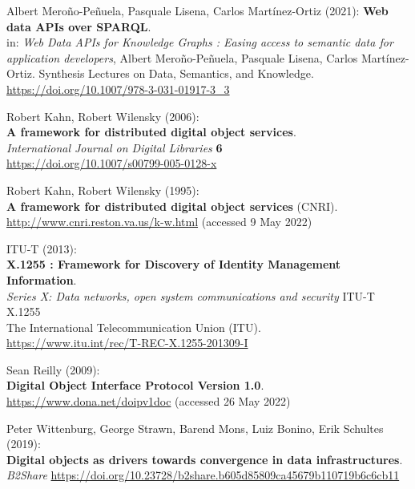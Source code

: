 \begin{thebibliography}{9}
Albert Meroño-Peñuela, Pasquale Lisena, Carlos Martínez-Ortiz (2021):
\textbf{Web data APIs over {SPARQL}}. \\
in: \emph{Web Data APIs for Knowledge Graphs : Easing access to semantic data for application developers}, 
Albert Meroño-Peñuela, Pasquale Lisena, Carlos Martínez-Ortiz.
Synthesis Lectures on Data, Semantics, and Knowledge.
\url{https://doi.org/10.1007/978-3-031-01917-3_3}

Robert Kahn, Robert Wilensky (2006): \\
\textbf{A framework for distributed digital object services}.\\
\emph{International Journal on Digital Libraries} \textbf{6} \\
\url{https://doi.org/10.1007/s00799-005-0128-x}

Robert Kahn, Robert Wilensky (1995): \\
\textbf{A framework for distributed digital object services} (CNRI).\\
\url{http://www.cnri.reston.va.us/k-w.html} (accessed 9 May 2022)

ITU-T (2013): \\
\textbf{X.1255 : Framework for Discovery of Identity Management Information}.\\
\emph{Series X: Data networks, open system communications and security} ITU-T X.1255 \\
The International Telecommunication Union (ITU).\\
\url{https://www.itu.int/rec/T-REC-X.1255-201309-I}

Sean Reilly (2009): \\
\textbf{Digital Object Interface Protocol Version 1.0}.\\
\url{https://www.dona.net/doipv1doc} (accessed 26 May 2022)

Peter Wittenburg, George Strawn, Barend Mons, Luiz Bonino, Erik
Schultes (2019): \\
\textbf{Digital objects as drivers towards convergence in data
infrastructures}. \\
\emph{B2Share}
\url{https://doi.org/10.23728/b2share.b605d85809ca45679b110719b6c6cb11}


\end{thebibliography}
